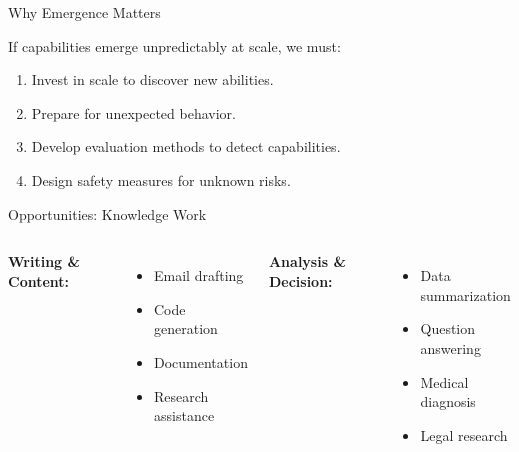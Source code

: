 \documentclass[aspectratio=169,10pt]{beamer}
\begin{document}
\begin{frame}{Why Emergence Matters}
  \begin{tcolorbox}[hitbox, title=Paradigm Implications]
    If capabilities emerge unpredictably at scale, we must:
    \begin{enumerate}
      \item Invest in scale to discover new abilities.
      \item Prepare for unexpected behavior.
      \item Develop evaluation methods to detect capabilities.
      \item Design safety measures for unknown risks.
    \end{enumerate}
  \end{tcolorbox}
\end{frame}


\begin{frame}{Opportunities: Knowledge Work}
  \begin{columns}[T]
      \textbf{Writing \& Content:}
      \begin{itemize}
        \item Email drafting
        \item Code generation
        \item Documentation
        \item Research assistance
      \end{itemize}

      \textbf{Analysis \& Decision:}
      \begin{itemize}
        \item Data summarization
        \item Question answering
        \item Medical diagnosis
        \item Legal research
      \end{itemize}
  \end{columns}
\end{frame}
\end{document}
